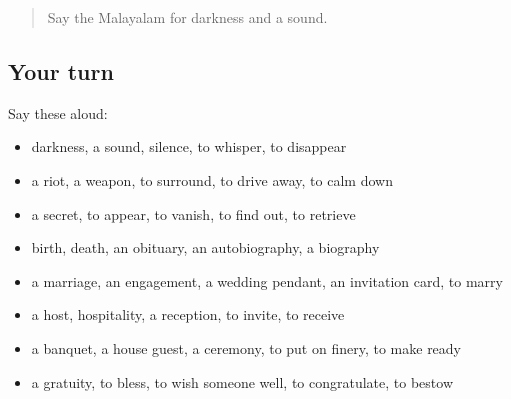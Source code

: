 \label{lesson:ML-R388-review-381-388}



\begin{quote}
Say the Malayalam for darkness and a sound.
\end{quote}

\subsection*{Your turn}
Say these aloud:

\begin{itemize}
\raggedright
  \item darkness, a sound, silence, to whisper, to disappear
  \item a riot, a weapon, to surround, to drive away, to calm down
  \item a secret, to appear, to vanish, to find out, to retrieve
  \item birth, death, an obituary, an autobiography, a biography
  \item a marriage, an engagement, a wedding pendant, an invitation card, to marry
  \item a host, hospitality, a reception, to invite, to receive
  \item a banquet, a house guest, a ceremony, to put on finery, to make ready
  \item a gratuity, to bless, to wish someone well, to congratulate, to bestow
\end{itemize}

